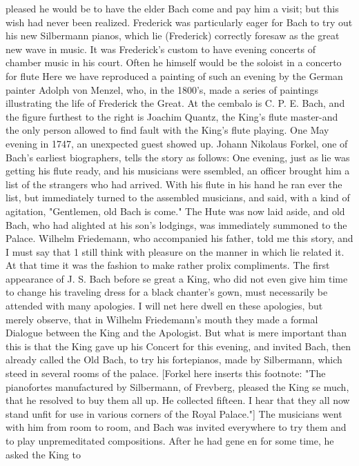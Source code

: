 pleased he would be to have the elder Bach come and pay him a visit; but this wish had
never been realized. Frederick was particularly eager for Bach to try out his new
Silbermann pianos, which lie (Frederick) correctly foresaw as the great new wave in
music.
   It was Frederick's custom to have evening concerts of chamber music in his court.
Often he himself would be the soloist in a concerto for flute Here we have reproduced a
painting of such an evening by the German painter Adolph von Menzel, who, in the
1800's, made a series of paintings illustrating the life of Frederick the Great. At the
cembalo is C. P. E. Bach, and the figure furthest to the right is Joachim Quantz, the
King's flute master-and the only person allowed to find fault with the King's flute
playing. One May evening in 1747, an unexpected guest showed up. Johann Nikolaus
Forkel, one of Bach's earliest biographers, tells the story
as follows:
 One evening, just as lie was getting his flute ready, and his musicians were ssembled,
 an officer brought him a list of the strangers who had arrived. With his flute in his hand
 he ran ever the list, but immediately turned to the assembled musicians, and said, with a
 kind of agitation, "Gentlemen, old Bach is come." The Hute was now laid aside, and old
 Bach, who had alighted at his son's lodgings, was immediately summoned to the Palace.
 Wilhelm Friedemann, who accompanied his father, told me this story, and I must say
 that 1 still think with pleasure on the manner in which lie related it. At that time it was
 the fashion to make rather prolix compliments. The first appearance of J. S. Bach before
 se great a King, who did not even give him time to change his traveling dress for a
 black chanter's gown, must necessarily be attended with many apologies. I will net here
 dwell en these apologies, but merely observe, that in Wilhelm Friedemann's mouth they
 made a formal Dialogue between the King and the Apologist.
 But what is mere important than this is that the King gave up his Concert for this
 evening, and invited Bach, then already called the Old Bach, to try his fortepianos,
 made by Silbermann, which steed in several rooms of the palace. [Forkel here inserts
 this footnote: "The pianofortes manufactured by Silbermann, of Frevberg, pleased the
 King se much, that he resolved to buy them all up. He collected fifteen. I hear that they
 all now stand unfit for use in various corners of the Royal Palace."] The musicians went
 with him from room to room, and Bach was invited everywhere to try them and to play
 unpremeditated compositions. After he had gene en for some time, he asked the King to

